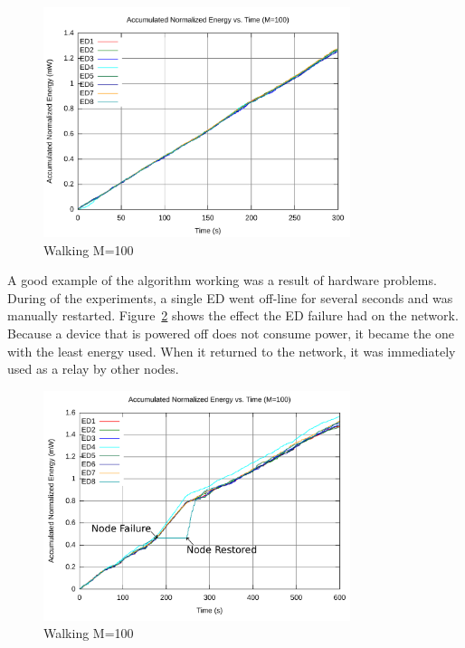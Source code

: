 \documentclass{article}
\begin{document}
\begin{figure}[!ht]
\includegraphics[width=0.8\textwidth]{figures/walk2-c100.pdf}
\caption{Walking M=100}
\label{fig:walk2-c100}
\end{figure}

A good example of the algorithm working was a result of hardware problems. During of the experiments, a single ED went off-line for several seconds and was manually restarted. Figure~\ref{fig:walk4-c100} shows the effect the ED failure had on the network. Because a device that is powered off does not consume power, it became the one with the least energy used. When it returned to the network, it was immediately used as a relay by other nodes. 

\begin{figure}[!ht]
\includegraphics[width=0.8\textwidth]{figures/walk4-c100.pdf}
\caption{Walking M=100}
\label{fig:walk4-c100}
\end{figure}
\end{document}
